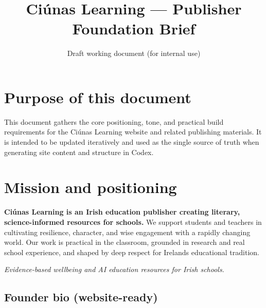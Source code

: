 \documentclass[11pt,a4paper]{article}
\title{\textbf{Ci\'unas Learning --- Publisher Foundation Brief}}
\author{Draft working document (for internal use)}
\date{}
\renewcommand{\emoji}[1]{}
\begin{document}
\maketitle
\tableofcontents

\section{Purpose of this document}

This document gathers the core positioning, tone, and practical build requirements for the Ci\'unas Learning website and related publishing materials. It is intended to be updated iteratively and used as the single source of truth when generating site content and structure in Codex.

\section{Mission and positioning}

\begin{tcolorbox}[
  colback=white,
  colframe=purple!40!black,
  opacityframe=0.5,
  fonttitle=\bfseries\color{white},
  title={\emoji{open_book} Narrative Text --- Mission (Draft)},
  drop shadow
]
\textbf{Ci\'unas Learning is an Irish education publisher creating literary, science-informed resources for schools.}
We support students and teachers in cultivating resilience, character, and wise engagement with a rapidly changing world.
Our work is practical in the classroom, grounded in research and real school experience, and shaped by deep respect for Ireland\textquotesingle s educational tradition.
\end{tcolorbox}

\begin{tcolorbox}[
  colback=white,
  colframe=green!40!black,
  opacityframe=0.5,
  fonttitle=\bfseries\color{black},
  title={\emoji{light_bulb} Tip Box --- Positioning line (Website header option)},
  drop shadow
]
\textit{Evidence-based wellbeing and AI education resources for Irish schools.}
\end{tcolorbox}

\subsection{Founder bio (website-ready)}
\end{document}
